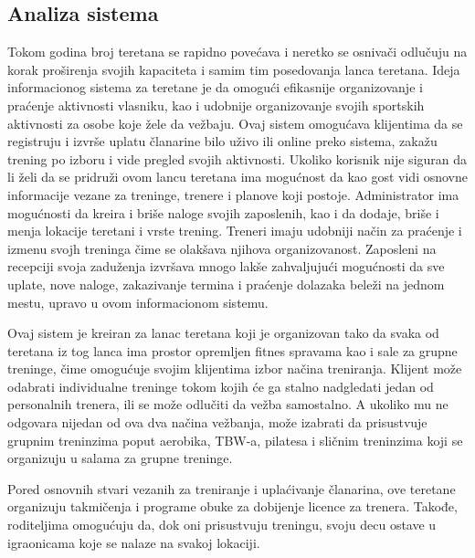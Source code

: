 \documentclass[../main.tex]{subfiles}
\begin{document}
\subsection{Analiza sistema}

Tokom godina broj teretana se rapidno povećava i neretko se osnivači odlučuju na korak proširenja svojih kapaciteta i samim tim posedovanja lanca teretana. Ideja informacionog sistema za teretane je da omogući efikasnije organizovanje i praćenje aktivnosti vlasniku, kao i udobnije organizovanje svojih sportskih aktivnosti za osobe koje žele da vežbaju. Ovaj sistem omogućava klijentima da se registruju i izvrše uplatu članarine bilo uživo ili online preko sistema, zakažu trening po izboru i vide pregled svojih aktivnosti. Ukoliko korisnik nije siguran da li želi da se pridruži ovom lancu teretana ima mogućnost da kao gost vidi osnovne informacije vezane za treninge, trenere i planove koji postoje. Administrator ima mogućnosti da kreira i briše naloge svojih zaposlenih, kao i da dodaje, briše i menja lokacije teretani i vrste trening. Treneri imaju udobniji način za praćenje i izmenu svojh treninga čime se olakšava njihova organizovanost. Zaposleni na recepciji svoja zaduženja izvršava mnogo lakše zahvaljujući mogućnosti da sve uplate, nove naloge, zakazivanje termina i praćenje dolazaka beleži na jednom mestu, upravo u ovom informacionom sistemu.

Ovaj sistem je kreiran za lanac teretana koji je organizovan tako da svaka od teretana iz tog lanca ima prostor opremljen fitnes spravama kao i sale za grupne treninge, čime omogućuje svojim klijentima izbor načina treniranja. Klijent može odabrati individualne treninge tokom kojih će ga stalno nadgledati jedan od personalnih trenera, ili se može odlučiti da vežba samostalno. A ukoliko mu ne odgovara nijedan od ova dva načina vežbanja, može izabrati da prisustvuje grupnim treninzima poput aerobika, TBW-a, pilatesa i sličnim treninzima koji se organizuju u salama za grupne treninge. 

Pored osnovnih stvari vezanih za treniranje i uplaćivanje članarina, ove teretane organizuju takmičenja i programe obuke za dobijenje licence za trenera. Takođe, roditeljima omogućuju da, dok oni prisustvuju treningu, svoju decu ostave u igraonicama koje se nalaze na svakoj lokaciji.
\end{document}

